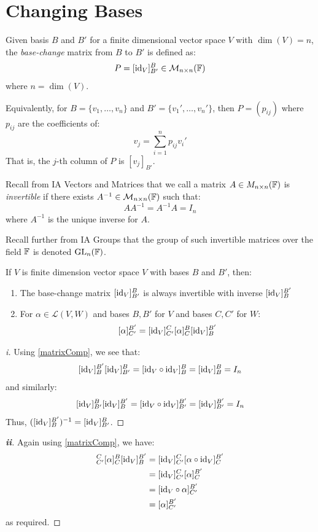 \documentclass[../main.tex]{subfiles}
\begin{document}
\section{Changing Bases}
\begin{definition}
  Given basis $B$ and $B'$ for a finite dimensional vector space $V$ with $\dim(V) = n$, the \textit{base-change} matrix from $B$ to $B'$ is defined as:
  \[
    P = [\mathrm{id}_V]^{B}_{B'} \in \mathcal{M}_{n \times n}(\mathbb{F})
  \]
  where $n = \dim(V)$.

  Equivalently, for $B = \{v_1, \ldots, v_n\}$ and $B' = \{v_1', \ldots, v_n'\}$, then $P = (p_{i j})$ where $p_{i j}$ are the coefficients of:
  \[
    v_j = \sum_{i = 1}^{n} p_{i j} v_i'
  \]
  That is, the $j$-th column of $P$ is $[v_j]_{B'}$.
\end{definition}
\begin{remark}[Recap]
  Recall from IA Vectors and Matrices that we call a matrix $A \in M_{n \times n}(\mathbb{F})$ is \textit{invertible} if there exists $A^{-1} \in \mathcal{M}_{n \times n}(\mathbb{F})$ such that:
  \[
    A A^{-1} = A^{-1} A = I_n
  \]
  where $A^{-1}$ is the unique inverse for $A$.

  Recall further from IA Groups that the group of such invertible matrices over the field $\mathbb{F}$ is denoted $\mathrm{GL}_n(\mathbb{F})$.
\end{remark}
\begin{proposition}
  If $V$ is finite dimension vector space $V$ with bases $B$ and $B'$, then: \label{cobFormula}
  \begin{enumerate}
    \item The base-change matrix $[\mathrm{id}_V]^{B}_{B'}$ is always invertible with inverse $[\mathrm{id}_V]^{B'}_{B}$
    \item For $\alpha \in \mathcal{L}(V, W)$ and bases $B, B'$ for $V$ and bases $C, C'$ for $W$:
      \[
        [\alpha]^{B'}_{C'} = [\mathrm{id}_V]^{C}_{C'} [\alpha]^{B}_{C} [\mathrm{id}_V]^{B'}_{B}
      \]
  \end{enumerate}
\end{proposition}
\begin{proof}[i]
  Using \cref{matrixComp}, we see that:
  \[
    [\mathrm{id}_V]^{B'}_{B} [\mathrm{id}_V]^{B}_{B'} = [\mathrm{id}_V \circ \mathrm{id}_V]^{B}_{B} = [\mathrm{id}_V]^{B}_{B} = I_n
  \]
  and similarly:
  \[
    [\mathrm{id}_V]^{B}_{B'} [\mathrm{id}_V]^{B'}_{B} = [\mathrm{id}_V \circ \mathrm{id}_V]^{B'}_{B'} = [\mathrm{id}_V]^{B'}_{B'} = I_n
  \]
  Thus, $([\mathrm{id}_V]^{B'}_{B})^{-1} = [\mathrm{id}_V]^{B}_{B'}$.
\end{proof}
\begin{proof}[\textbf{ii}]
  Again using \cref{matrixComp}, we have:
  \begin{align*}
    [\id_V]^{C}_{C'} [\alpha]^{B}_{C} [\id_V]^{B'}_{B} &= [\id_V]^{C}_{C'} [\alpha \circ \id_V]^{B'}_{C} \\
                                                       &= [\id_V]^{C}_{C'} [\alpha]^{B'}_{C} \\
                                                       &= [\id_V \circ \alpha]^{B'}_{C'} \\
                                                       &= [\alpha]^{B'}_{C'}
  \end{align*}
  as required.
\end{proof}
\end{document}
